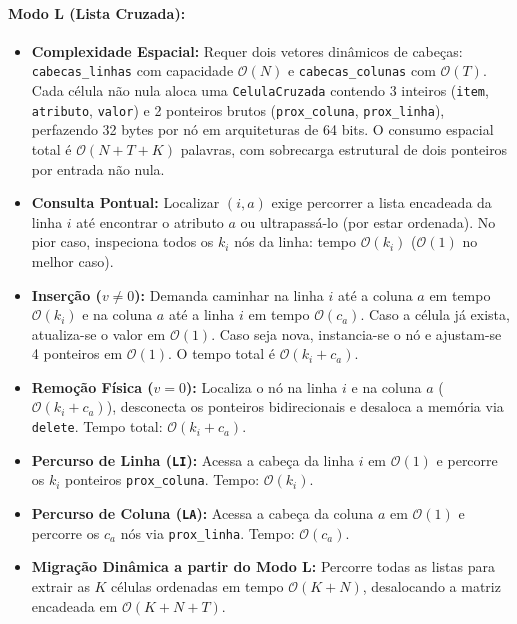 \documentclass[letterpaper]{article}
\begin{document}
\paragraph{Modo L (Lista Cruzada):}
\begin{itemize}
    \item \textbf{Complexidade Espacial:} Requer dois vetores dinâmicos de cabeças: \texttt{cabecas\_linhas} com capacidade $\mathcal{O}(N)$ e \texttt{cabecas\_colunas} com $\mathcal{O}(T)$. Cada célula não nula aloca uma \texttt{CelulaCruzada} contendo 3 inteiros (\texttt{item}, \texttt{atributo}, \texttt{valor}) e 2 ponteiros brutos (\texttt{prox\_coluna}, \texttt{prox\_linha}), perfazendo 32 bytes por nó em arquiteturas de 64 bits. O consumo espacial total é $\mathcal{O}(N + T + K)$ palavras, com sobrecarga estrutural de dois ponteiros por entrada não nula.
    \item \textbf{Consulta Pontual:} Localizar $(i, a)$ exige percorrer a lista encadeada da linha $i$ até encontrar o atributo $a$ ou ultrapassá-lo (por estar ordenada). No pior caso, inspeciona todos os $k_i$ nós da linha: tempo $\mathcal{O}(k_i)$ ($\mathcal{O}(1)$ no melhor caso).
    \item \textbf{Inserção ($v \neq 0$):} Demanda caminhar na linha $i$ até a coluna $a$ em tempo $\mathcal{O}(k_i)$ e na coluna $a$ até a linha $i$ em tempo $\mathcal{O}(c_a)$. Caso a célula já exista, atualiza-se o valor em $\mathcal{O}(1)$. Caso seja nova, instancia-se o nó e ajustam-se 4 ponteiros em $\mathcal{O}(1)$. O tempo total é $\mathcal{O}(k_i + c_a)$.
    \item \textbf{Remoção Física ($v = 0$):} Localiza o nó na linha $i$ e na coluna $a$ ($\mathcal{O}(k_i + c_a)$), desconecta os ponteiros bidirecionais e desaloca a memória via \texttt{delete}. Tempo total: $\mathcal{O}(k_i + c_a)$.
    \item \textbf{Percurso de Linha (\texttt{LI}):} Acessa a cabeça da linha $i$ em $\mathcal{O}(1)$ e percorre os $k_i$ ponteiros \texttt{prox\_coluna}. Tempo: $\mathcal{O}(k_i)$.
    \item \textbf{Percurso de Coluna (\texttt{LA}):} Acessa a cabeça da coluna $a$ em $\mathcal{O}(1)$ e percorre os $c_a$ nós via \texttt{prox\_linha}. Tempo: $\mathcal{O}(c_a)$.
    \item \textbf{Migração Dinâmica a partir do Modo L:} Percorre todas as listas para extrair as $K$ células ordenadas em tempo $\mathcal{O}(K + N)$, desalocando a matriz encadeada em $\mathcal{O}(K + N + T)$.
\end{itemize}
\end{document}
